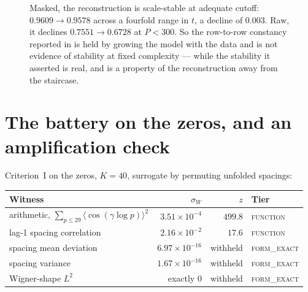 \documentclass[11pt]{article}
\theoremstyle{remark}
\newcommand{\tier}[1]{\textsc{\MakeLowercase{#1}}}
\begin{document}
\begin{figure}[ht]\centering
{}
\caption{Masked, the reconstruction is scale-stable at adequate cutoff: $0.9609\to
0.9578$ across a fourfold range in $t$, a decline of $0.003$. Raw, it declines
$0.7551\to0.6728$ at $P{<}300$. So the row-to-row constancy reported in
\cite{threelayer} is held by growing the model with the data and is not evidence of
stability at fixed complexity --- while the stability it asserted is real, and is a
property of the reconstruction away from the staircase.}
\label{fig:scale}
\end{figure}

\section{The battery on the zeros, and an amplification check}\label{sec:zresults}

Criterion~I on the zeros, $K=40$, surrogate by permuting unfolded spacings:

\begin{center}\small
\begin{tabular}{lrrl}
\toprule
Witness & $\sigma_W$ & $z$ & Tier \\
\midrule
arithmetic, $\sum_{p\le29}\langle\cos(\gamma\log p)\rangle^2$ & $3.51\times10^{-4}$ & $\mathbf{499.8}$ & \tier{FUNCTION} \\
lag-1 spacing correlation & $2.16\times10^{-2}$ & $\mathbf{17.6}$ & \tier{FUNCTION} \\
spacing mean deviation & $6.97\times10^{-16}$ & withheld & \tier{FORM\_EXACT} \\
spacing variance & $1.67\times10^{-16}$ & withheld & \tier{FORM\_EXACT} \\
Wigner-shape $L^2$ & exactly $0$ & withheld & \tier{FORM\_EXACT} \\
\bottomrule
\end{tabular}
\end{center}
\end{document}
